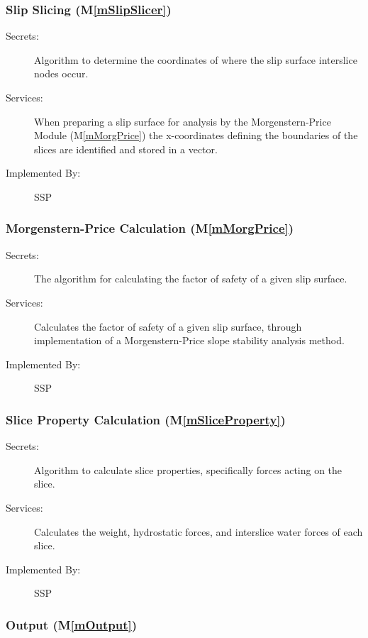 \documentclass[12pt, titlepage]{article}
\newcommand{\progname}{SSP}
\newcommand{\mref}[1]{M\ref{#1}}
\begin{document}
\subsubsection{Slip Slicing (\mref{mSlipSlicer})}

\begin{description}
	\item[Secrets:] Algorithm to determine the coordinates of where the
	slip surface interslice nodes occur.
	\item[Services:] When preparing a slip surface for analysis by the
	Morgenstern-Price Module (\mref{mMorgPrice}) the x-coordinates defining the 
	boundaries of the slices are identified and stored in a vector.
	\item[Implemented By:] \progname
\end{description} 

\subsubsection{Morgenstern-Price Calculation (\mref{mMorgPrice})}

\begin{description}
\item[Secrets:] The algorithm for calculating the factor of safety of a given 
slip surface.
\item[Services:] Calculates the factor of safety of a given slip
  surface, through implementation of a Morgenstern-Price slope
  stability analysis method.
\item[Implemented By:] \progname
\end{description} 

\subsubsection{Slice Property Calculation (\mref{mSliceProperty})}
\begin{description}
\item[Secrets:] Algorithm to calculate slice properties, specifically forces 
acting on the slice. 
\item[Services:] Calculates the weight, hydrostatic forces, and interslice 
water forces of each slice.
\item[Implemented By:] \progname
\end{description} 

\subsubsection{Output (\mref{mOutput})}
\end{document}
